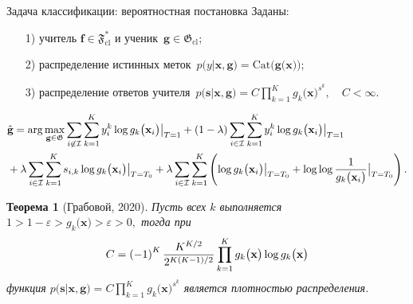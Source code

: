 \documentclass[10pt,pdf,hyperref={unicode}]{beamer}
\newtheorem{rustheorem}{Теорема}
\begin{document}
\begin{frame}{Задача классификации: вероятностная постановка}
\justifying
Заданы:
\begin{enumerate}
	\item[1)] учитель $\textbf{f}\in\mathfrak{F}_{\text{cl}}^{*}$ и ученик~$\textbf{g}\in\mathfrak{G}_{\text{cl}}$;
	\item[2)] распределение истинных меток~$p\bigr(y|\textbf{x}, \textbf{g}\bigr) = \text{Cat}\bigr(\textbf{g}\bigr(\textbf{x}\bigr)\bigr)$;
	\item[3)] распределение ответов учителя~$p\bigr(\textbf{s}|\textbf{x}, \textbf{g}\bigr) = C\prod_{k=1}^{K}g_k\bigr(\textbf{x}\bigr)^{s^k}, \quad C < \infty.$
\end{enumerate}
\[
\setlength\abovedisplayskip{0pt}
\begin{aligned}
&\hat{\textbf{g}} = \arg\max_{\textbf{g}\in \mathfrak{G}} \sum_{i\not\in \mathcal{I}}\sum_{k=1}^{K}y_i^k\log g_k\bigr(\textbf{x}_i\bigr)\bigr|_{T=1} 
+ \left(1-\lambda\right)\sum_{i\in \mathcal{I}}\sum_{k=1}^{K}y_i^k\log g_k\bigr(\textbf{x}_i\bigr)\bigr|_{T=1} \\
&+ \lambda\sum_{i\in \mathcal{I}}\sum_{k=1}^{K}s_{i,k}\log g_k\bigr(\textbf{x}_i\bigr)\bigr|_{T=T_0} 
+ \lambda \sum_{i\in \mathcal{I}}\sum_{k=1}^{K}\left(\log g_k\bigr(\textbf{x}_i\bigr)\bigr|_{T=T_0} + \log\log\frac{1}{g_k\bigr(\textbf{x}_i\bigr)}\bigr|_{T=T_0}\right).
\end{aligned}
\setlength\belowdisplayskip{0pt}
\]

\begin{rustheorem}[Грабовой, 2020]
\label{theorem:st:dist}
Пусть всех $k$ выполняется $1 > 1- \varepsilon > g_k\bigr(\textbf{x}\bigr) > \varepsilon > 0,$ тогда при
\[
\setlength\abovedisplayskip{0pt}
C=\left(-1\right)^{K}\frac{K^{K/2}}{2^{K(K-1)/2}}\prod_{k=1}^{K}g_k\bigr(\textbf{x}\bigr)\log g_k\bigr(\textbf{x}\bigr)
\setlength\belowdisplayskip{0pt}
\]
функция $p\bigr(\textbf{s}|\textbf{x}, \textbf{g}\bigr) = C\prod_{k=1}^{K}g_k\bigr(\textbf{x}\bigr)^{s^k}$ является плотностью распределения.
\end{rustheorem}

\end{frame}
\end{document}
